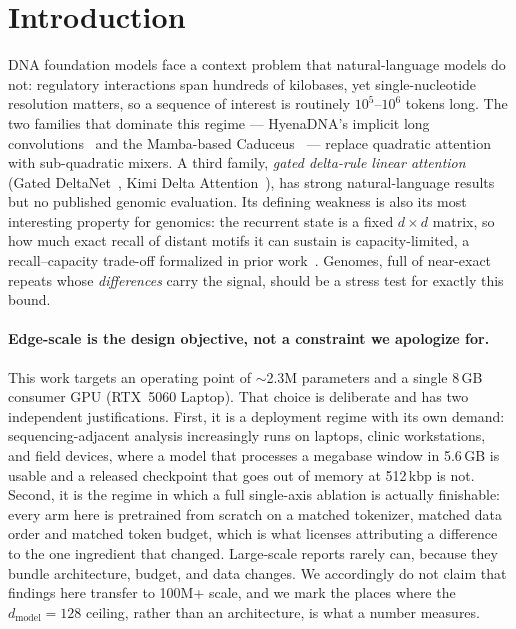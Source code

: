 \documentclass[11pt]{article}
\theoremstyle{plain}
\begin{document}
\section{Introduction}\label{sec:intro}

DNA foundation models face a context problem that natural-language models do not: regulatory
interactions span hundreds of kilobases, yet single-nucleotide resolution matters, so a sequence
of interest is routinely $10^5$--$10^6$ tokens long. The two families that dominate this regime
--- HyenaDNA's implicit long convolutions~\cite{nguyen2023hyenadna} and the Mamba-based
Caduceus~\cite{schiff2024caduceus} --- replace quadratic attention with sub-quadratic mixers. A
third family, \emph{gated delta-rule linear attention} (Gated DeltaNet~\cite{yang2025gated}, Kimi
Delta Attention~\cite{kimilinear2025}), has strong natural-language results but no published
genomic evaluation. Its defining weakness is also its most interesting property for genomics: the
recurrent state is a fixed $d\times d$ matrix, so how much exact recall of distant motifs it can sustain is
capacity-limited, a recall--capacity trade-off formalized in prior
work~\cite{arora2023zoology}. Genomes, full of near-exact repeats whose \emph{differences} carry
the signal, should be a stress test for exactly this bound.

\paragraph{Edge-scale is the design objective, not a constraint we apologize for.}
This work targets an operating point of $\sim$2.3M parameters and a single 8\,GB consumer GPU
(RTX~5060 Laptop). That choice is deliberate and has two independent justifications. First, it is
a deployment regime with its own demand: sequencing-adjacent analysis increasingly runs on
laptops, clinic workstations, and field devices, where a model that processes a megabase window
in 5.6\,GB is usable and a released checkpoint that goes out of memory at 512\,kbp is not.
Second, it is the regime in which a full single-axis ablation is actually finishable: every arm
here is pretrained from scratch on a matched tokenizer, matched data order and matched token
budget, which is what licenses attributing a difference to the one ingredient that changed.
Large-scale reports rarely can, because they bundle architecture, budget, and data changes.
We accordingly do not claim that findings here transfer to 100M+ scale, and we mark the places
where the $d_{\text{model}}{=}128$ ceiling, rather than an architecture, is what a number
measures.
\end{document}
